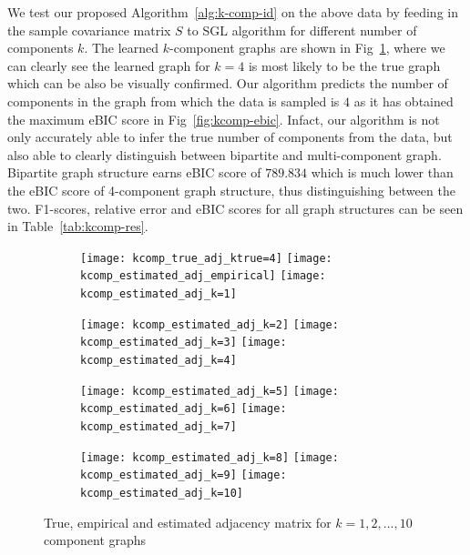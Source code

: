 We test our proposed Algorithm~\ref{alg:k-comp-id} on the above data by feeding in the sample covariance matrix $S$ to SGL algorithm for different number of components $k$. The learned $k$-component graphs are shown in Fig~\ref{fig:kcomp-adj}, where we can clearly see the learned graph for $k=4$ is most likely to be the true graph which can be also be visually confirmed. Our algorithm predicts the number of components in the graph from which the data is sampled is $4$ as it has obtained the maximum eBIC score in Fig~\ref{fig:kcomp-ebic}. Infact, our algorithm is not only accurately able to infer the true number of components from the data, but also able to clearly distinguish between bipartite and multi-component graph. Bipartite graph structure earns eBIC score of $789.834$ which is much lower than the eBIC score of 4-component graph structure, thus distinguishing between the two. F1-scores, relative error and eBIC scores for all graph structures can be seen in Table~\ref{tab:kcomp-res}.

\begin{figure}[htpb]
	\begin{subfigure}{\linewidth}
		\texttt{[image: kcomp\_true\_adj\_ktrue=4]}\hfill
		\texttt{[image: kcomp\_estimated\_adj\_empirical]}\hfill
		\texttt{[image: kcomp\_estimated\_adj\_k=1]}
		\caption{}
	\end{subfigure}\par\medskip
		\begin{subfigure}{\linewidth}
		\texttt{[image: kcomp\_estimated\_adj\_k=2]}\hfill
		\texttt{[image: kcomp\_estimated\_adj\_k=3]}\hfill
		\texttt{[image: kcomp\_estimated\_adj\_k=4]}
		\caption{}
	\end{subfigure}\par\medskip
		\begin{subfigure}{\linewidth}
		\texttt{[image: kcomp\_estimated\_adj\_k=5]}\hfill
		\texttt{[image: kcomp\_estimated\_adj\_k=6]}\hfill
		\texttt{[image: kcomp\_estimated\_adj\_k=7]}
		\caption{}
	\end{subfigure}\par\medskip
	\begin{subfigure}{\linewidth}
	\texttt{[image: kcomp\_estimated\_adj\_k=8]}\hfill
	\texttt{[image: kcomp\_estimated\_adj\_k=9]}\hfill
	\texttt{[image: kcomp\_estimated\_adj\_k=10]}
	\caption{}
	\end{subfigure}\par\medskip
	\caption{True, empirical and estimated adjacency matrix for $k=1,2,...,10$ component graphs}
	\label{fig:kcomp-adj}
\end{figure}

